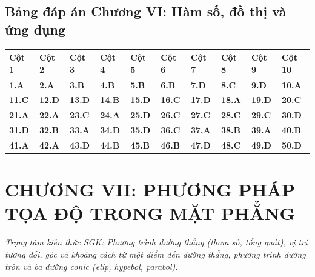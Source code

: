 \documentclass[11pt,a4paper]{article}
\begin{document}
\subsection*{\color{primary} Bảng đáp án Chương VI: Hàm số, đồ thị và ứng dụng}
\begin{center}
\renewcommand{\arraystretch}{1.25}
\begin{tabularx}{\textwidth}{*{10}{>{\centering\arraybackslash}X}}
\toprule
\textbf{\color{primary} Cột 1} & \textbf{\color{primary} Cột 2} & \textbf{\color{primary} Cột 3} & \textbf{\color{primary} Cột 4} & \textbf{\color{primary} Cột 5} & \textbf{\color{primary} Cột 6} & \textbf{\color{primary} Cột 7} & \textbf{\color{primary} Cột 8} & \textbf{\color{primary} Cột 9} & \textbf{\color{primary} Cột 10} \\
\midrule
\textbf{1.A} & \textbf{2.A} & \textbf{3.B} & \textbf{4.B} & \textbf{5.B} & \textbf{6.B} & \textbf{7.D} & \textbf{8.C} & \textbf{9.D} & \textbf{10.A} \\
\rowcolor{rowtint} \textbf{11.C} & \textbf{12.D} & \textbf{13.D} & \textbf{14.B} & \textbf{15.D} & \textbf{16.C} & \textbf{17.D} & \textbf{18.A} & \textbf{19.D} & \textbf{20.C} \\
\textbf{21.A} & \textbf{22.A} & \textbf{23.C} & \textbf{24.A} & \textbf{25.D} & \textbf{26.C} & \textbf{27.C} & \textbf{28.C} & \textbf{29.C} & \textbf{30.D} \\
\rowcolor{rowtint} \textbf{31.D} & \textbf{32.B} & \textbf{33.A} & \textbf{34.D} & \textbf{35.D} & \textbf{36.C} & \textbf{37.A} & \textbf{38.B} & \textbf{39.A} & \textbf{40.B} \\
\textbf{41.A} & \textbf{42.A} & \textbf{43.D} & \textbf{44.B} & \textbf{45.B} & \textbf{46.B} & \textbf{47.D} & \textbf{48.C} & \textbf{49.D} & \textbf{50.D} \\
\bottomrule
\end{tabularx}
\end{center}\vspace{10pt}
\section*{\color{primary} CHƯƠNG VII: PHƯƠNG PHÁP TỌA ĐỘ TRONG MẶT PHẲNG}
\textit{Trọng tâm kiến thức SGK: Phương trình đường thẳng (tham số, tổng quát), vị trí tương đối, góc và khoảng cách từ một điểm đến đường thẳng, phương trình đường tròn và ba đường conic (elip, hypebol, parabol).}\par\vspace{4pt}
\end{document}
